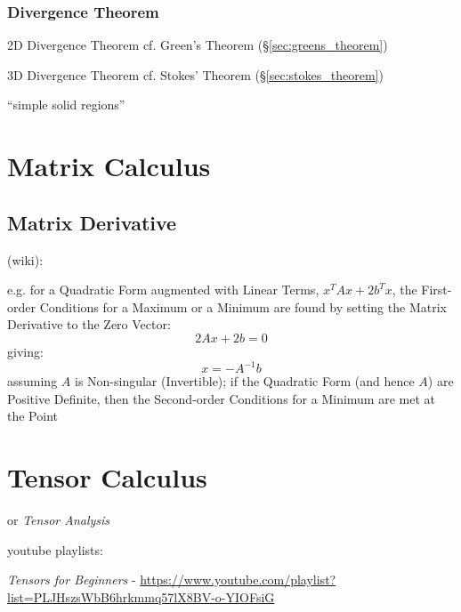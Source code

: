\subsubsection{Divergence Theorem}\label{sec:divergence_theorem}

2D Divergence Theorem \fist cf. Green's Theorem (\S\ref{sec:greens_theorem})

3D Divergence Theorem \fist cf. Stokes' Theorem (\S\ref{sec:stokes_theorem})

``simple solid regions''



\section{Matrix Calculus}\label{sec:matrix_calculus}

\subsection{Matrix Derivative}\label{sec:matrix_derivative}

(wiki):

e.g. for a Quadratic Form augmented with Linear Terms, $x^TAx + 2b^Tx$, the
First-order Conditions for a Maximum or a Minimum are found by setting the
Matrix Derivative to the Zero Vector:
\[
  2Ax + 2b = 0
\]
giving:
\[
  x = -A^{-1}b
\]
assuming $A$ is Non-singular (Invertible); if the Quadratic Form (and hence
$A$) are Positive Definite, then the Second-order Conditions for a
Minimum are met at the Point



\section{Tensor Calculus}\label{sec:tensor_calculus}

or \emph{Tensor Analysis}

youtube playlists:

\emph{Tensors for Beginners} -
\url{https://www.youtube.com/playlist?list=PLJHszsWbB6hrkmmq57lX8BV-o-YIOFsiG}

